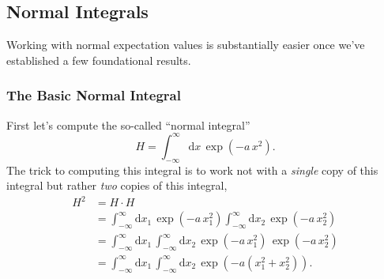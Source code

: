 \documentclass[
  letterpaper,
  DIV=11,
  numbers=noendperiod]{scrartcl}
\begin{document}
\hypertarget{normal-integrals}{%
\subsection{Normal Integrals}\label{normal-integrals}}

Working with normal expectation values is substantially easier once
we've established a few foundational results.

\hypertarget{the-basic-normal-integral}{%
\subsubsection{The Basic Normal
Integral}\label{the-basic-normal-integral}}

First let's compute the so-called ``normal integral'' \[
H = \int_{-\infty}^{\infty} \mathrm{d} x \, \exp \left( -a \, x^{2} \right).
\] The trick to computing this integral is to work not with a
\emph{single} copy of this integral but rather \emph{two} copies of this
integral, \begin{align*}
H^{2}
&=
H \cdot H
\\
&=
\int_{-\infty}^{\infty} \mathrm{d} x_{1} \, \exp \left( -a \, x_{1}^{2} \right)
\int_{-\infty}^{\infty} \mathrm{d} x_{2} \, \exp \left( -a \, x_{2}^{2} \right)
\\
&=
\int_{-\infty}^{\infty} \mathrm{d} x_{1} \,
\int_{-\infty}^{\infty} \mathrm{d} x_{2} \,
\exp \left( -a \, x_{1}^{2} \right) \, \exp \left( -a \, x_{2}^{2} \right)
\\
&=
\int_{-\infty}^{\infty} \mathrm{d} x_{1} \,
\int_{-\infty}^{\infty} \mathrm{d} x_{2} \,
\exp \left( -a \left( x_{1}^{2} + x_{2}^{2} \right) \right).
\end{align*}
\end{document}
